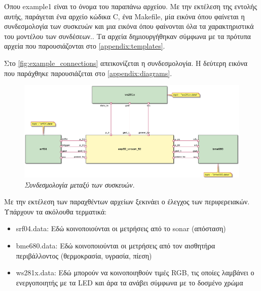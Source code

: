 Όπου example1 είναι το όνομα του παραπάνω αρχείου. Με την εκτέλεση της εντολής αυτής, παράγεται ένα αρχείο κώδικα C, ένα Makefile, μία εικόνα όπου φαίνεται η συνδεσμολογία των συσκευών και μια εικόνα όπου φαίνονται όλα τα χαρακτηριστικά του μοντέλου των συνδέσεων.. Τα αρχεία δημιουργήθηκαν σύμφωνα με τα πρότυπα αρχεία που παρουσιάζονται στο \autoref{appendix:templates}.

Στο \autoref{fig:example_connections} απεικονίζεται η συνδεσμολογία. Η δεύτερη εικόνα που παράχθηκε παρουσιάζεται στο \autoref{appendix:diagrams}.

\begin{figure}[!ht]
	\centering
	\includegraphics[width=1.0\textwidth]{./images/chapter6/example1a.png}
	\caption[\textit{Συνδεσμολογία μεταξύ των συσκευών}.]{\textit{Συνδεσμολογία μεταξύ των συσκευών}.}
	\label{fig:example_connections}
\end{figure}

Με την εκτέλεση των παραχθέντων αρχείων ξεκινάει ο έλεγχος των περιφερειακών. Υπάρχουν τα ακόλουθα τερματικά:

\begin{itemize}
	\item srf04.data: Εδώ κοινοποιούνται οι μετρήσεις από το sonar (απόσταση)
	\item bme680.data: Εδώ κοινοποιούνται οι μετρήσεις από τον αισθητήρα περιβάλλοντος (θερμοκρασία, υγρασία, πίεση)
	\item ws281x.data: Εδώ μπορούν να κοινοποιηθούν τιμές RGB, τις οποίες λαμβάνει ο ενεργοποιητής με τα LED και άρα τα ανάβει σύμφωνα με το δοσμένο χρώμα
\end{itemize}
